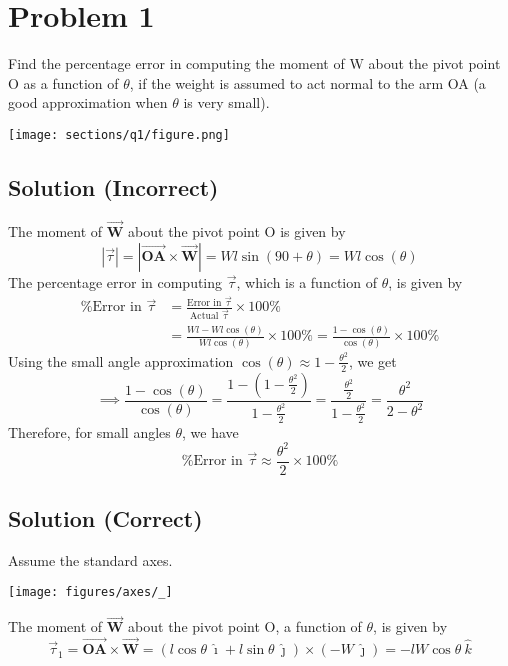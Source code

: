 \section*{Problem 1}

Find the percentage error in computing the moment of W about the pivot point O as a function of \( \theta \), if the weight is assumed to act normal to the arm OA (a good approximation when \( \theta \) is very small).

\begin{figure*}[h]
    \centering
    \texttt{[image: sections/q1/figure.png]}
\end{figure*}

\subsection*{Solution (Incorrect)}

The moment of \( \vec{\mathbf{W}} \) about the pivot point O is given by
\[
    |\vec{\tau}| = |\vec{\mathbf{OA}} \times \vec{\mathbf{W}}|
    = W l \sin(90 + \theta)
    = W l \cos(\theta)
\]
The percentage error in computing \( \vec{\tau} \), which is a function of \( \theta \),  is given by
\begin{align*}
    \text{\%Error in } \vec{\tau}
     & =
    \frac{\text{Error in }\vec{\tau}}{\text{Actual }\vec{\tau}} \times 100\% \\
     & = \frac{W l - W l \cos(\theta)}{W l \cos(\theta)} \times 100\%
    = \frac{1 - \cos(\theta)}{\cos(\theta)} \times 100\%
\end{align*}
Using the small angle approximation \( \cos(\theta) \approx 1 - \frac{\theta^2}{2} \), we get
\[
    \implies \frac{1 - \cos(\theta)}{\cos(\theta)}
    = \frac{1 - (1 - \frac{\theta^2}{2})}{1 - \frac{\theta^2}{2}}
    = \frac{\frac{\theta^2}{2}}{1 - \frac{\theta^2}{2}}
    = \frac{\theta^2}{2 - \theta^2}
\]
Therefore, for small angles \( \theta \), we have
\[
    \boxed{
        \text{\%Error in } \vec{\tau} \approx \frac{\theta^2}{2} \times 100\%
    }
\]

\subsection*{Solution (Correct)}

Assume the standard axes.
\vspace{-2em}
\begin{center}
    \texttt{[image: figures/axes/\_]}
\end{center}
\vspace{-1em}
The moment of \( \vec{\mathbf{W}} \) about the pivot point O, a function of \( \theta \), is given by
\[
    \vec{\tau}_1 = \vec{\mathbf{OA}} \times \vec{\mathbf{W}}
    = (l \cos \theta \ \hat{\imath} + l \sin \theta \ \hat{\jmath}) \times (- W \ \hat{\jmath})
    = -lW \cos \theta \ \hat{k}
\]


